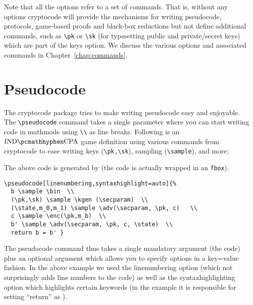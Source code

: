 \documentclass[a4paper]{report}
\begin{document}
Note that all the options refer to a set of commands. That is, without any options cryptocode will provide the mechanisms
for writing pseudocode, protocols, game-based proofs and black-box reductions but not define additional commands,
such as \lstinline$\pk$ or \lstinline$\sk$ (for typesetting public and private/secret keys) which are part of the keys option.
We discuss the various options and associated commands in Chapter~\ref{chap:commands}.


\section{Pseudocode}
The cryptocode package tries to make writing pseudocode easy and enjoyable. The
\lstinline$\pseudocode$ command takes a single parameter where you can start writing
code in mathmode using \lstinline{\\} as line breaks. Following is an $\indcpa$ game
definition using various commands from cryptocode to ease writing keys (\lstinline{\pk,\sk}),
sampling (\lstinline{\sample}), and more:
\begin{center}
\end{center}


The above code is generated by (the code is actually wrapped in an \lstinline$fbox$).
\begin{lstlisting}
\pseudocode[linenumbering,syntaxhighlight=auto]{%
  b \sample \bin  \\
  (\pk,\sk) \sample \kgen (\secparam)  \\
  (\state,m_0,m_1) \sample \adv(\secparam, \pk, c)   \\
  c \sample \enc(\pk,m_b)  \\
  b' \sample \adv(\secparam, \pk, c, \state)  \\
  return b = b' }
\end{lstlisting}
The pseudocode command thus takes a single mandatory argument (the code) plus an optional argument
which allows you to specify options in a key=value fashion. In the above example we used the linenumbering
option (which not surprisingly adds line numbers to the code) as well as the syntaxhighlighting option which
highlights certain keywords (in the example it is responsible for setting \enquote{return} as ).
\end{document}
